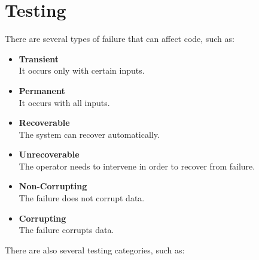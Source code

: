 \documentclass{article}
\begin{document}
\section{Testing}
There are several types of failure that can affect code, such as:

\begin{itemize}
	\item \textbf{Transient}
	\vspace{.2cm} \\
	It occurs only with certain inputs.
	
	\item \textbf{Permanent}
	\vspace{.2cm} \\
	It occurs with all inputs.
	
	\item \textbf{Recoverable}
	\vspace{.2cm} \\
	The system can recover automatically.
	
	\item \textbf{Unrecoverable}
	\vspace{.2cm} \\
	The operator needs to intervene in order to recover from failure.
	
	\item \textbf{Non-Corrupting}
	\vspace{.2cm} \\
	The failure does not corrupt data.
	
	\item \textbf{Corrupting}
	\vspace{.2cm} \\
	The failure corrupts data.	 
\end{itemize}
There are also several testing categories, such as:
\end{document}
